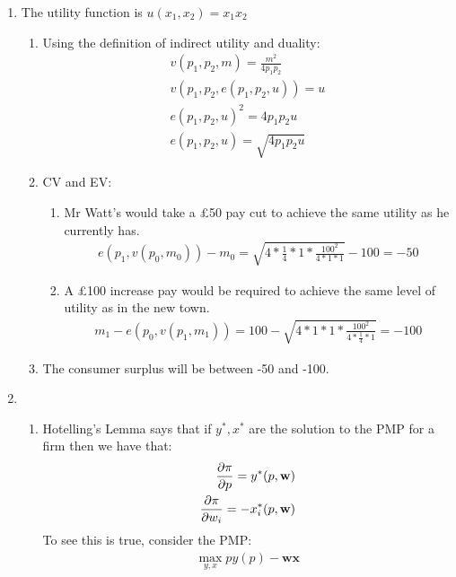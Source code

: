 \documentclass{article}
\begin{document}
    \begin{enumerate}

        \item The utility function is $u(x_1,x_2) = x_1x_2$
        \begin{enumerate}
            \item Using the definition of indirect utility and duality:
            \begin{align*}
                v(p_1,p_2,m) = \frac{m^2}{4p_1p_2} \\
                v(p_1,p_2,e(p_1,p_2,u)) = u \\
                e(p_1,p_2,u)^2 = 4p_1p_2u \\
                e(p_1,p_2,u) = \sqrt{4p_1p_2u}
            \end{align*}
            \item CV and EV:
            \begin{enumerate}
                \item Mr Watt's would take a £50 pay cut to achieve the same utility as he currently has.
                \begin{align*}
                    e(p_1,v(p_0,m_0)) - m_0 = \sqrt{4 * \frac{1}{4} * 1 * \frac{100^2}{4 * 1 * 1}} - 100 = -50
                \end{align*}
                \item A £100 increase pay would be required to achieve the same level of utility as in the new town.
                \begin{align*}
                    m_1 - e(p_0,v(p_1,m_1)) = 100 - \sqrt{4 * 1 * 1 * \frac{100^2}{4 * \frac{1}{4} * 1}} = -100
                \end{align*}
            \end{enumerate}
            \item The consumer surplus will be between -50 and -100.
        \end{enumerate}
        
        \item 
        \begin{enumerate}
            \item Hotelling's Lemma says that if $y^*,x^*$ are the solution to the PMP for a firm then we have that:
            \begin{align*}
                \pdv{\pi}{p} = y^*(p,\textbf{w}) \\
                \pdv{\pi}{w_i} = -x^*_i(p,\textbf{w})
            \end{align*}
            To see this is true, consider the PMP:
            \begin{align*}
                \max_{y,x} py(p) - \textbf{wx}
            \end{align*}


\end{enumerate}
\end{enumerate}
\end{document}

